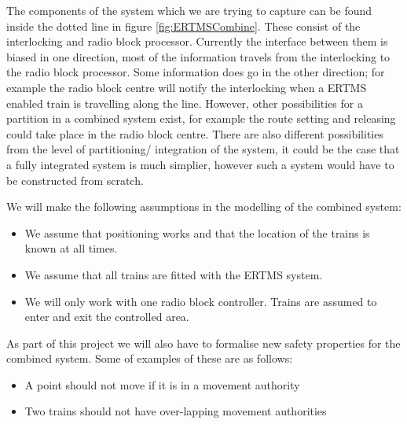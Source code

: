 The components of the system which we are trying to capture can be found inside the dotted line in figure \ref{fig:ERTMSCombine}. These consist of the interlocking and radio block processor. Currently the interface between them is biased in one direction, most of the information travels from the interlocking to the radio block processor. Some information does go in the other direction; for example the radio block centre will notify the interlocking when a ERTMS enabled train is travelling along the line.  However, other possibilities for a partition in a combined system exist, for example the route setting and releasing could take place in the radio block centre. There are also different possibilities from the level of partitioning/ integration of the system, it could be the case that a fully integrated system is much simplier, however such a system would have to be constructed from scratch. 



We will make the following assumptions in the modelling of the combined system:

\begin{itemize}

\item We assume that positioning works and that the location of the trains is known at all times.

\item We assume that all trains are fitted with the ERTMS system.

\item We will only work with one radio block controller. Trains are assumed to enter and exit the controlled area.


\end{itemize}

As part of this project we will also have to formalise new safety properties for the combined system. Some of examples of these are as follows:

\begin{itemize}

\item A point should not move if it is in a movement authority

\item Two trains should not have over-lapping movement authorities

\end{itemize}


